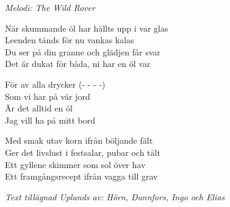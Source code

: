 {\footnotesize\textit{Melodi: The Wild Rover}}\par
\vspace{10pt}
När skummande öl har hällts upp i var glas\\
Leenden tänds för nu vankas kalas\\
Du ser på din granne och glädjen får svar\\
Det är dukat för båda, ni har en öl var\par
\vspace{10pt}
\revrpt För av alla drycker (- - - -)\\
Som vi har på vår jord\\
Är det alltid en öl\\
Jag vill ha på mitt bord\rpt\par
\vspace{10pt}
Med smak utav korn ifrån böljande fält\\
Ger det livslust i festsalar, pubar och tält\\
Ett gyllene skimmer som sol över hav\\
Ett framgångsrecept ifrån vagga till grav\par
\vspace{10pt}
{\footnotesize\textit{Text tillägnad Uplands av: Hörn, Dannfors, Ingo och Elias}}
